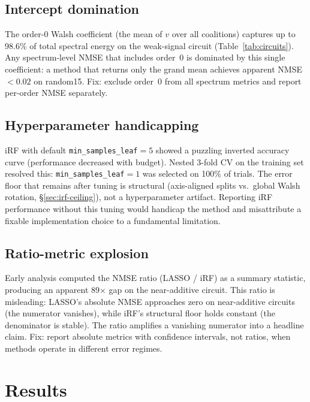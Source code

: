 \documentclass[10pt]{article}
\begin{document}
\subsection{Intercept domination}

The order-0 Walsh coefficient (the mean of $v$ over all coalitions)
captures up to 98.6\% of total spectral energy on the weak-signal
circuit (Table~\ref{tab:circuits}). Any spectrum-level NMSE that
includes order~0 is dominated by this single coefficient: a method
that returns only the grand mean achieves apparent NMSE~$< 0.02$ on
random15. Fix: exclude order~0 from all spectrum metrics and report
per-order NMSE separately.

\subsection{Hyperparameter handicapping}

iRF with default \texttt{min\_samples\_leaf}$=5$ showed a puzzling
inverted accuracy curve (performance decreased with budget). Nested
3-fold CV on the training set resolved this:
\texttt{min\_samples\_leaf}$=1$ was selected on 100\% of trials.
The error floor that remains after tuning is structural
(axis-aligned splits vs.\ global Walsh rotation,
\S\ref{sec:irf-ceiling}), not a hyperparameter artifact.
Reporting iRF performance without this tuning would handicap the
method and misattribute a fixable implementation choice to a
fundamental limitation.

\subsection{Ratio-metric explosion}

Early analysis computed the NMSE ratio (LASSO / iRF) as a summary
statistic, producing an apparent 89$\times$ gap on the near-additive
circuit. This ratio is misleading: LASSO's absolute NMSE approaches
zero on near-additive circuits (the numerator vanishes), while
iRF's structural floor holds constant (the denominator is stable).
The ratio amplifies a vanishing numerator into a headline claim.
Fix: report absolute metrics with confidence intervals, not ratios,
when methods operate in different error regimes.


\section{Results}
\label{sec:results}
\end{document}
